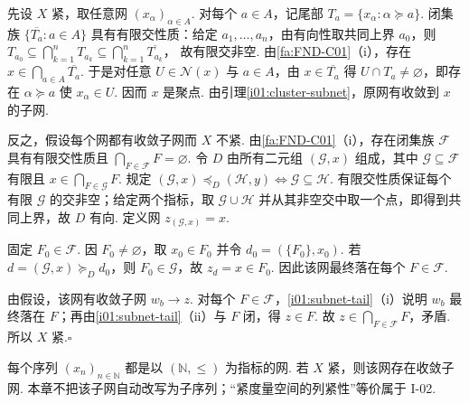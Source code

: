 \begin{FAProof}
先设 \(\displaystyle X\) 紧，取任意网 \(\displaystyle (x_\alpha)_{\alpha\in A}\). 对每个 \(\displaystyle a\in A\)，记尾部 \(\displaystyle T_a=\{x_\alpha:\alpha\succeq a\}\). 闭集族 \(\displaystyle \{\overline{T_a}:a\in A\}\) 具有有限交性质：给定 \(\displaystyle a_1,\dots,a_n\)，由有向性取共同上界 \(\displaystyle a_0\)，则 \(\displaystyle T_{a_0}\subseteq\bigcap_{k=1}^{n}T_{a_k} \subseteq\bigcap_{k=1}^{n}\overline{T_{a_k}}\)，
故有限交非空. 由\autoref{fa:FND-C01}（i），存在
\(\displaystyle x\in\bigcap_{a\in A}\overline{T_a}\).
于是对任意 \(\displaystyle U\in\mathcal N(x)\) 与 \(\displaystyle a\in A\)，由 \(\displaystyle x\in\overline{T_a}\) 得 \(\displaystyle U\cap T_a\neq\varnothing\)，即存在 \(\displaystyle \alpha\succeq a\) 使 \(\displaystyle x_\alpha\in U\). 因而 \(\displaystyle x\) 是聚点. 由引理\ref{i01:cluster-subnet}，原网有收敛到 \(\displaystyle x\) 的子网.

反之，假设每个网都有收敛子网而 \(\displaystyle X\) 不紧. 由\autoref{fa:FND-C01}（i），存在闭集族 \(\displaystyle \mathcal F\) 具有有限交性质且
\(\displaystyle \bigcap_{F\in\mathcal F}F=\varnothing\).
令 \(\displaystyle D\) 由所有二元组 \(\displaystyle (\mathcal G,x)\) 组成，其中 \(\displaystyle \mathcal G\subseteq\mathcal F\) 有限且 \(\displaystyle x\in\bigcap_{F\in\mathcal G}F\). 规定 \(\displaystyle (\mathcal G,x)\preceq_D(\mathcal H,y) \iff \mathcal G\subseteq\mathcal H\).
有限交性质保证每个有限 \(\displaystyle \mathcal G\) 的交非空；给定两个指标，取 \(\displaystyle \mathcal G\cup\mathcal H\) 并从其非空交中取一个点，即得到共同上界，故 \(\displaystyle D\) 有向. 定义网 \(\displaystyle z_{(\mathcal G,x)}=x\).

固定 \(\displaystyle F_0\in\mathcal F\). 因 \(\displaystyle F_0\neq\varnothing\)，取 \(\displaystyle x_0\in F_0\) 并令 \(\displaystyle d_0=(\{F_0\},x_0)\). 若 \(\displaystyle d=(\mathcal G,x)\succeq_D d_0\)，则 \(\displaystyle F_0\in\mathcal G\)，故 \(\displaystyle z_d=x\in F_0\). 因此该网最终落在每个 \(\displaystyle F\in\mathcal F\).

由假设，该网有收敛子网 \(\displaystyle w_b\to z\). 对每个 \(\displaystyle F\in\mathcal F\)，\autoref{i01:subnet-tail}（i）说明 \(\displaystyle w_b\) 最终落在 \(\displaystyle F\)；再由\autoref{i01:subnet-tail}（ii）与 \(\displaystyle F\) 闭，得 \(\displaystyle z\in F\). 故 \(\displaystyle z\in\bigcap_{F\in\mathcal F}F\)，矛盾. 所以 \(\displaystyle X\) 紧.\hfill\(\square\)
\end{FAProof}

\begin{FAExample}[序列只是网的特例]
每个序列 \(\displaystyle (x_n)_{n\in\mathbb N}\) 都是以 \(\displaystyle (\mathbb N,\leqslant)\) 为指标的网. 若 \(\displaystyle X\) 紧，则该网存在收敛子网. 本章不把该子网自动改写为子序列；“紧度量空间的列紧性”等价属于 I-02.
\end{FAExample}

